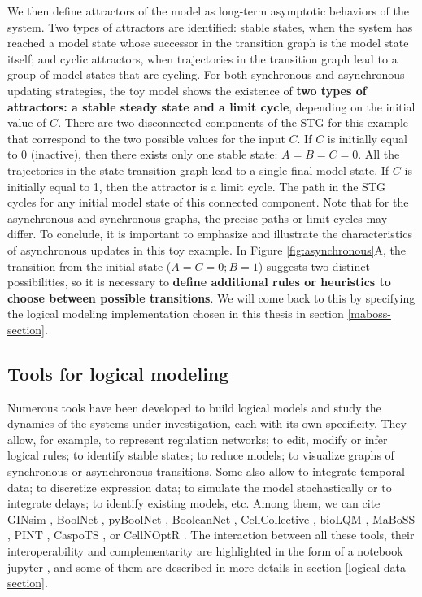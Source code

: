 \documentclass[a4paper,12pt,twoside,onecolumn,openright,final,oldfontcommands]{memoir}
\begin{document}
We then define attractors of the model as long-term asymptotic behaviors
of the system. Two types of attractors are identified: stable states,
when the system has reached a model state whose successor in the
transition graph is the model state itself; and cyclic attractors, when
trajectories in the transition graph lead to a group of model states
that are cycling. For both synchronous and asynchronous updating
strategies, the toy model shows the existence of \textbf{two types of
attractors: a stable steady state and a limit cycle}, depending on the
initial value of \(C\). There are two disconnected components of the STG
for this example that correspond to the two possible values for the
input \(C\). If \(C\) is initially equal to 0 (inactive), then there
exists only one stable state: \(A=B=C=0\). All the trajectories in the
state transition graph lead to a single final model state. If \(C\) is
initially equal to 1, then the attractor is a limit cycle. The path in
the STG cycles for any initial model state of this connected component.
Note that for the asynchronous and synchronous graphs, the precise paths
or limit cycles may differ. To conclude, it is important to emphasize
and illustrate the characteristics of asynchronous updates in this toy
example. In Figure \ref{fig:asynchronous}A, the transition from the
initial state (\(A=C=0;B=1\)) suggests two distinct possibilities, so it
is necessary to \textbf{define additional rules or heuristics to choose
between possible transitions}. We will come back to this by specifying
the logical modeling implementation chosen in this thesis in section
\ref{maboss-section}.

\subsection{Tools for logical
modeling}\label{tools-for-logical-modeling}

Numerous tools have been developed to build logical models and study the
dynamics of the systems under investigation, each with its own
specificity. They allow, for example, to represent regulation networks;
to edit, modify or infer logical rules; to identify stable states; to
reduce models; to visualize graphs of synchronous or asynchronous
transitions. Some also allow to integrate temporal data; to discretize
expression data; to simulate the model stochastically or to integrate
delays; to identify existing models, etc. Among them, we can cite GINsim
\citep{naldi2018logical}, BoolNet \citep{mussel2010boolnet}, pyBoolNet
\citep{klarner2016pyboolnet}, BooleanNet \citep{albert2008boolean},
CellCollective \citep{helikar2012cell}, bioLQM \citep{naldi2018biolqm},
MaBoSS \citep{stoll2012continuous, stoll2017maboss}, PINT \citep{Pint},
CaspoTS \citep{ostrowski2016boolean}, or CellNOptR
\citep{terfve2012cellnoptr}. The interaction between all these tools,
their interoperability and complementarity are highlighted in the form
of a notebook jupyter \citep{naldi2018colomoto}, and some of them are
described in more details in section \ref{logical-data-section}.
\end{document}
